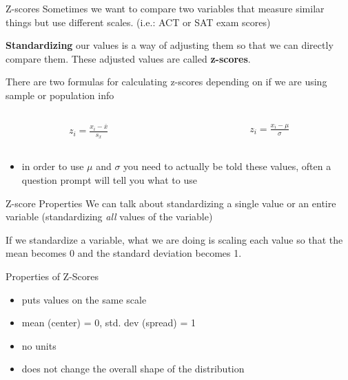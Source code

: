 \documentclass{beamer}
\begin{document}
\begin{frame}{Z-scores}
Sometimes we want to compare two variables that measure similar things but use different scales. (i.e.: ACT or SAT exam scores) \vspace{3mm}

\textbf{Standardizing} our values is a way of adjusting them so that we can directly compare them. These adjusted values are called \textbf{z-scores}. \vspace{10mm}

There are two formulas for calculating z-scores depending on if we are using sample or population info
\begin{columns}
  \begin{column}{0.45\textwidth}
        \begin{align*}
            z_i = \frac{x_i - \overline{x}}{s_x}
        \end{align*}
  \end{column}
  \begin{column}{0.45\textwidth}
        \begin{align*}
            z_i = \frac{x_i - \mu}{\sigma}
        \end{align*}
  \end{column}
\end{columns} \vspace{2mm}
\begin{itemize}
    \item in order to use $\mu$ and $\sigma$ you need to actually be told these values, often a question prompt will tell you what to use
\end{itemize}
\end{frame}



\begin{frame}{Z-score Properties}
We can talk about standardizing a single value or an entire variable (standardizing \textit{all} values of the variable) \vspace{3mm}

If we standardize a variable, what we are doing is scaling each value so that the mean becomes 0 and the standard deviation becomes 1. \vspace{3mm}

Properties of Z-Scores
\begin{itemize}
    \item puts values on the same scale
    \item mean (center) = 0, std. dev (spread) = 1
    \item no units
    \item does not change the overall shape of the distribution
\end{itemize}
\end{frame}
\end{document}
